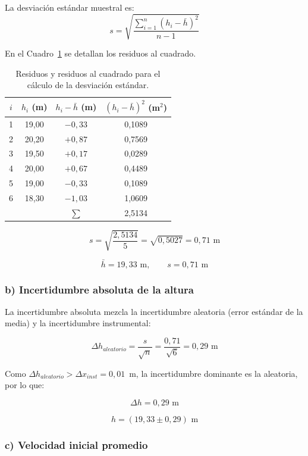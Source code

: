 La desviación estándar muestral es:
\[
s = \sqrt{\frac{\sum_{i=1}^{n}(h_i - \bar{h})^2}{n-1}}
\]

En el Cuadro~\ref{tab:desviacion} se detallan los residuos al cuadrado.

\begin{table}[htbp]
  \centering
  \begin{tabular}{c c c c}
    \toprule
    $i$ & $h_i$ (m) & $h_i - \bar{h}$ (m) & $(h_i - \bar{h})^2$ (m$^2$) \\
    \midrule
    1 & 19{,}00 & $-0{,}33$ & 0{,}1089 \\
    2 & 20{,}20 & $+0{,}87$ & 0{,}7569 \\
    3 & 19{,}50 & $+0{,}17$ & 0{,}0289 \\
    4 & 20{,}00 & $+0{,}67$ & 0{,}4489 \\
    5 & 19{,}00 & $-0{,}33$ & 0{,}1089 \\
    6 & 18{,}30 & $-1{,}03$ & 1{,}0609 \\
    \midrule
    & & $\sum$ & 2{,}5134 \\
    \bottomrule
  \end{tabular}
  \caption{Residuos y residuos al cuadrado para el cálculo de la desviación estándar.}
  \label{tab:desviacion}
\end{table}

\[
s = \sqrt{\frac{2{,}5134}{5}} = \sqrt{0{,}5027} = 0{,}71 \text{ m}
\]

\[
\boxed{\bar{h} = 19{,}33 \text{ m}, \qquad s = 0{,}71 \text{ m}}
\]

\subsubsection*{b) Incertidumbre absoluta de la altura}

La incertidumbre absoluta mezcla la incertidumbre aleatoria
(error estándar de la media) y la incertidumbre instrumental:

\[
\Delta h_{aleatorio} = \frac{s}{\sqrt{n}} = \frac{0{,}71}{\sqrt{6}} = 0{,}29 \text{ m}
\]

Como $\Delta h_{aleatorio} > \Delta x_{inst} = 0{,}01$~m, la incertidumbre
dominante es la aleatoria, por lo que:

\[
\boxed{\Delta h = 0{,}29 \text{ m}}
\]

\[
\boxed{h = (19{,}33 \pm 0{,}29) \text{ m}}
\]

\subsubsection*{c) Velocidad inicial promedio}

